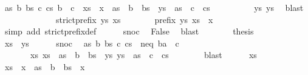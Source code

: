 \begin{isabellebody}
\ {\isachardoublequoteopen}{\isasymexists}as\ b\ bs\ c\ cs{\isachardot}\ b\ {\isasymnoteq}\ c\ {\isasymand}\ xs\ {\isacharat}\ {\isacharbrackleft}x{\isacharbrackright}\ {\isacharequal}\ as\ {\isacharat}\ b\ {\isacharhash}\ bs\ {\isasymand}\ ys\ {\isacharequal}\ as\ {\isacharat}\ c\ {\isacharhash}\ cs{\isachardoublequoteclose}\isanewline
\ \ \ \ \ \ \ \ \isamarkupfalse%
\ ys\ ys{\isacharprime}\ \isamarkupfalse%
\ blast\isanewline
\ \ \ \ \isamarkupfalse%
\isanewline
\ \ \isamarkupfalse%
\isanewline
\ \ \ \ \isamarkupfalse%
\ {\isachardoublequoteopen}strict{\isacharunderscore}prefix\ ys\ xs{\isachardoublequoteclose}\isanewline
\ \ \ \ \isamarkupfalse%
\ \isamarkupfalse%
\ {\isachardoublequoteopen}prefix\ ys\ {\isacharparenleft}xs\ {\isacharat}\ {\isacharbrackleft}x{\isacharbrackright}{\isacharparenright}{\isachardoublequoteclose}\ \isamarkupfalse%
\ {\isacharparenleft}simp\ add{\isacharcolon}\ strict{\isacharunderscore}prefix{\isacharunderscore}def{\isacharparenright}\isanewline
\ \ \ \ \isamarkupfalse%
\ snoc\ \isamarkupfalse%
\ False\ \isamarkupfalse%
\ blast\isanewline
\ \ \ \ \isamarkupfalse%
\ \isamarkupfalse%
\ {\isacharquery}thesis\ \isacommand{{\isachardot}{\isachardot}}\isamarkupfalse%
\isanewline
\ \ \isamarkupfalse%
\isanewline
\ \ \ \ \isamarkupfalse%
\ {\isachardoublequoteopen}xs\ {\isasymparallel}\ ys{\isachardoublequoteclose}\isanewline
\ \ \ \ \isamarkupfalse%
\ snoc\ \isamarkupfalse%
\ as\ b\ bs\ c\ cs\ \ neq{\isacharcolon}\ {\isachardoublequoteopen}{\isacharparenleft}b{\isacharcolon}{\isacharcolon}{\isacharprime}a{\isacharparenright}\ {\isasymnoteq}\ c{\isachardoublequoteclose}\isanewline
\ \ \ \ \ \ \ xs{\isacharcolon}\ {\isachardoublequoteopen}xs\ {\isacharequal}\ as\ {\isacharat}\ b\ {\isacharhash}\ bs{\isachardoublequoteclose}\ \ ys{\isacharcolon}\ {\isachardoublequoteopen}ys\ {\isacharequal}\ as\ {\isacharat}\ c\ {\isacharhash}\ cs{\isachardoublequoteclose}\isanewline
\ \ \ \ \ \ \isamarkupfalse%
\ blast\isanewline
\ \ \ \ \isamarkupfalse%
\ xs\ \isamarkupfalse%
\ {\isachardoublequoteopen}xs\ {\isacharat}\ {\isacharbrackleft}x{\isacharbrackright}\ {\isacharequal}\ as\ {\isacharat}\ b\ {\isacharhash}\ {\isacharparenleft}bs\ {\isacharat}\ {\isacharbrackleft}x{\isacharbrackright}{\isacharparenright}{\isachardoublequoteclose}\ \isamarkupfalse%

\end{isabellebody}
